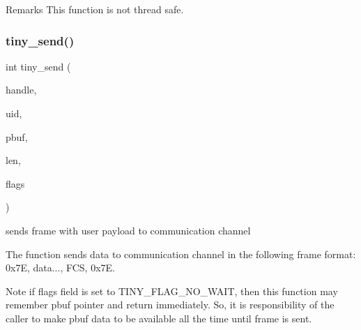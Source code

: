 \begin{DoxyRemark}{Remarks}
This function is not thread safe. 
\end{DoxyRemark}
\mbox{\label{group__SIMPLE__API_ga988a41addbe75dc15cc13006de6740e0}} 
\subsubsection{\texorpdfstring{tiny\+\_\+send()}{tiny\_send()}}
{\footnotesize\ttfamily int tiny\+\_\+send (\begin{DoxyParamCaption}\item[{\hyperlink{structSTinyData}{S\+Tiny\+Data} $\ast$}]{handle,  }\item[{uint16\+\_\+t $\ast$}]{uid,  }\item[{uint8\+\_\+t $\ast$}]{pbuf,  }\item[{int}]{len,  }\item[{uint8\+\_\+t}]{flags }\end{DoxyParamCaption})}



sends frame with user payload to communication channel 

The function sends data to communication channel in the following frame format\+: 0x7E, data..., F\+CS, 0x7E. \begin{DoxyNote}{Note}
if flags field is set to T\+I\+N\+Y\+\_\+\+F\+L\+A\+G\+\_\+\+N\+O\+\_\+\+W\+A\+IT, then this function may remember pbuf pointer and return immediately. So, it is responsibility of the caller to make pbuf data to be available all the time until frame is sent. 
\end{DoxyNote}

